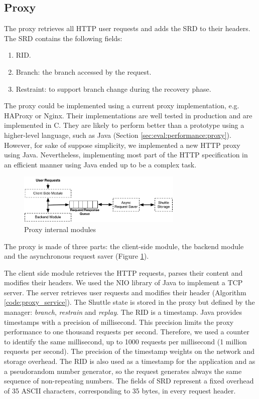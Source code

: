 \subsection{Proxy}\label{sec:impl:normal:proxy}
The proxy retrieves all \ac{HTTP} user requests and adds the \acf{SRD} to their headers. The \ac{SRD} contains the following fields:
\begin{enumerate}
	\item \acf{RID}.
	\item Branch: the branch accessed by the request.
	\item Restraint: to support branch change during the recovery phase.
\end{enumerate}

The proxy could be implemented using a current proxy implementation, e.g. HAProxy or Nginx. Their implementations are well tested in production and are implemented in C. They are likely to perform better than a prototype using a higher-level language, such as Java (Section \ref{sec:eval:performance:proxy}). However, for sake of suppose simplicity, we implemented a new \ac{HTTP} proxy using Java. Nevertheless, implementing most part of the \ac{HTTP} specification in an efficient manner using Java ended up to be a complex task.


\begin{figure}
  \centering
  \includegraphics[width=0.7\textwidth]{arch/proxy}
  \caption{Proxy internal modules}
  \label{fig:impl:proxy_modules}
\end{figure}

The proxy is made of three parts: the client-side module, the backend module and the asynchronous request saver (Figure \ref{fig:impl:proxy_modules}).

The client side module retrieves the \ac{HTTP} requests, parses their content and modifies their headers. We used the \acf{NIO} library of Java to implement a TCP server. The server retrieves user requests and modifies their header (Algorithm \ref{code:proxy_service}). The Shuttle state is stored in the proxy but defined by the manager: \emph{branch}, \emph{restrain} and \emph{replay}. The \acf{RID} is a timestamp. Java provides timestamps with a precision of millisecond. This precision limits the proxy performance to one thousand requests per second. Therefore, we used a counter to identify the same millisecond, up to 1000 requests per millisecond (1 million requests per second). The precision of the timestamp weights on the network and storage overhead. The \ac{RID} is also used as a timestamp for the application and as a pseudorandom number generator, so the request generates always the same sequence of non-repeating numbers. The fields of \acf{SRD} represent a fixed overhead of 35 ASCII characters, corresponding to 35 bytes, in every request header.

